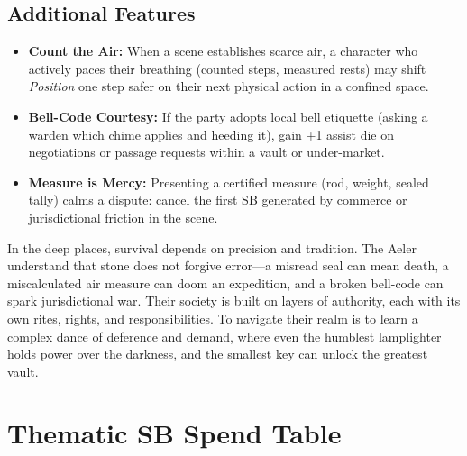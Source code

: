 \subsection*{Additional Features}
\begin{itemize}
\item \textbf{Count the Air:} When a scene establishes scarce air, a character who actively paces their breathing (counted steps, measured rests) may shift \emph{Position} one step safer on their next physical action in a confined space.
\item \textbf{Bell-Code Courtesy:} If the party adopts local bell etiquette (asking a warden which chime applies and heeding it), gain +1 assist die on negotiations or passage requests within a vault or under-market.
\item \textbf{Measure is Mercy:} Presenting a certified measure (rod, weight, sealed tally) calms a dispute: cancel the first SB generated by commerce or jurisdictional friction in the scene.
\end{itemize}

\begin{tcolorbox}[colback=black!3,colframe=black!40!white,title={Stone \& Sovereignty}]
In the deep places, survival depends on precision and tradition. The Aeler understand that stone does not forgive error---a misread seal can mean death, a miscalculated air measure can doom an expedition, and a broken bell-code can spark jurisdictional war. Their society is built on layers of authority, each with its own rites, rights, and responsibilities. To navigate their realm is to learn a complex dance of deference and demand, where even the humblest lamplighter holds power over the darkness, and the smallest key can unlock the greatest vault.
\end{tcolorbox}


\section*{Thematic SB Spend Table}
\label{sec:thematic-sb}

